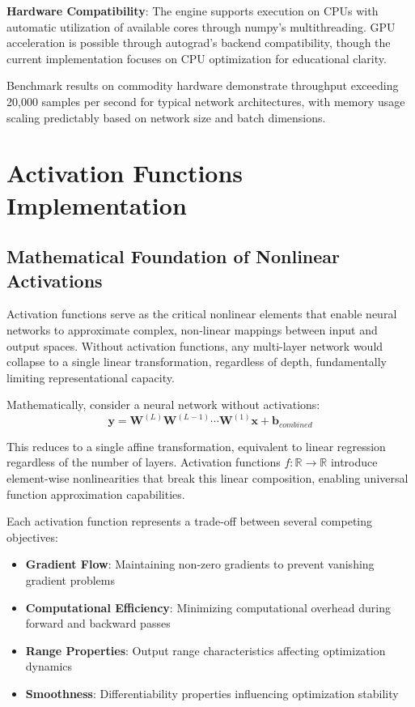 \documentclass[11pt,a4paper]{report}
\begin{document}
\textbf{Hardware Compatibility}: The engine supports execution on CPUs with automatic utilization of available cores through numpy's multithreading. GPU acceleration is possible through autograd's backend compatibility, though the current implementation focuses on CPU optimization for educational clarity.

Benchmark results on commodity hardware demonstrate throughput exceeding 20,000 samples per second for typical network architectures, with memory usage scaling predictably based on network size and batch dimensions.

\section{Activation Functions Implementation}

\subsection{Mathematical Foundation of Nonlinear Activations}

Activation functions serve as the critical nonlinear elements that enable neural networks to approximate complex, non-linear mappings between input and output spaces. Without activation functions, any multi-layer network would collapse to a single linear transformation, regardless of depth, fundamentally limiting representational capacity.

Mathematically, consider a neural network without activations:
\begin{equation}
\mathbf{y} = \mathbf{W}^{(L)} \mathbf{W}^{(L-1)} \cdots \mathbf{W}^{(1)} \mathbf{x} + \mathbf{b}_{combined}
\end{equation}

This reduces to a single affine transformation, equivalent to linear regression regardless of the number of layers. Activation functions $f: \mathbb{R} \rightarrow \mathbb{R}$ introduce element-wise nonlinearities that break this linear composition, enabling universal function approximation capabilities.

Each activation function represents a trade-off between several competing objectives:
\begin{itemize}
\item \textbf{Gradient Flow}: Maintaining non-zero gradients to prevent vanishing gradient problems
\item \textbf{Computational Efficiency}: Minimizing computational overhead during forward and backward passes
\item \textbf{Range Properties}: Output range characteristics affecting optimization dynamics
\item \textbf{Smoothness}: Differentiability properties influencing optimization stability
\end{itemize}
\end{document}
